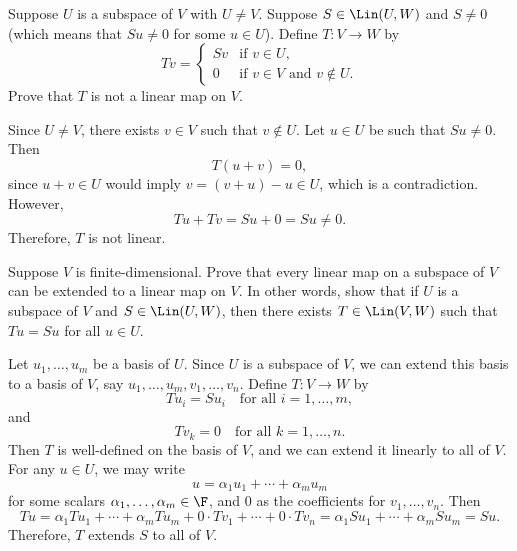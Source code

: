 \begin{exc}
\begin{exercise}
Suppose $U$ is a subspace of $V$ with $U\ne V$. Suppose $S\in\Lin(U,W)$ and
$S\ne0$ (which means that $Su\ne0$ for some $u\in U$). Define
$T\colon V\to W$ by
\[ Tv=\begin{cases} Sv & \text{if } v\in U,\\
   0 & \text{if } v\in V \text{ and } v\notin U. \end{cases} \]
Prove that $T$ is not a linear map on $V$.
\end{exercise}
\begin{solution}
Since $U\ne V$, there exists $v\in V$ such that $v\notin U$. Let $u\in U$ be
such that $Su\ne0$. Then
\[ T(u+v)=0, \]
since $u+v\in U$ would imply $v=(v+u)-u\in U$, which is a contradiction.
However,
\[ Tu+Tv=Su+0=Su\ne0. \]
Therefore, $T$ is not linear.
\end{solution}

\begin{exercise}
Suppose $V$ is finite-dimensional. Prove that every linear map on a subspace
of $V$ can be extended to a linear map on $V$. In other words, show that if
$U$ is a subspace of $V$ and $S\in\Lin(U,W)$, then there exists
$T\in\Lin(V,W)$ such that $Tu=Su$ for all $u\in U$.
\end{exercise}
\begin{solution}
Let $u_1,\dots,u_m$ be a basis of $U$. Since $U$ is a subspace of $V$, we can
extend this basis to a basis of $V$, say $u_1,\dots,u_m,v_1,\dots,v_n$. Define
$T\colon V\to W$ by
\[ Tu_i=Su_i \quad\text{for all } i=1,\dots,m, \]
and
\[ Tv_k=0 \quad\text{for all } k=1,\dots,n. \]
Then $T$ is well-defined on the basis of $V$, and we can extend it linearly to
all of $V$. For any $u\in U$, we may write
\[ u=\alpha_1u_1+\cdots+\alpha_mu_m \]
for some scalars $\alpha_1,\dots,\alpha_m\in\F$, and $0$ as the coefficients
for $v_1,\dots,v_n$. Then
\[ Tu=\alpha_1Tu_1+\cdots+\alpha_mTu_m+0\cdot Tv_1+\cdots+0\cdot Tv_n
   =\alpha_1Su_1+\cdots+\alpha_mSu_m=Su. \]
Therefore, $T$ extends $S$ to all of $V$.
\end{solution}


\end{exc}
